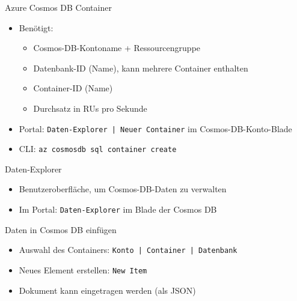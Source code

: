 \begin{flashcard}{Azure Cosmos DB Container}
    \begin{itemize}
        \item Benötigt:
        \begin{itemize}
            \item Cosmos-DB-Kontoname + Ressourcengruppe
            \item Datenbank-ID (Name), kann mehrere Container enthalten
            \item Container-ID (Name)
            \item Durchsatz in RUs pro Sekunde
        \end{itemize}
        \item Portal: \texttt{Daten-Explorer | Neuer Container} im Cosmos-DB-Konto-Blade
        \item CLI:\newline
        \texttt{az cosmosdb sql container create}
    \end{itemize}
\end{flashcard}

\begin{flashcard}[Definition]{Daten-Explorer}
    \begin{itemize}
        \item Benutzeroberfläche, um Cosmos-DB-Daten zu verwalten
        \item Im Portal: \texttt{Daten-Explorer} im Blade der Cosmos DB
    \end{itemize}
\end{flashcard}

\begin{flashcard}[Definition]{Daten in Cosmos DB einfügen}
    \begin{itemize}
        \item Auswahl des Containers: \texttt{Konto | Container | Datenbank}
        \item Neues Element erstellen: \texttt{New Item}
        \item Dokument kann eingetragen werden (als JSON)
    \end{itemize}
\end{flashcard}

